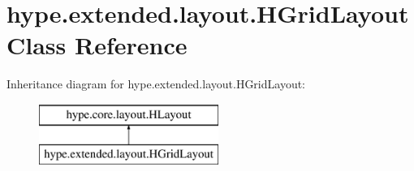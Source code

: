 \hypertarget{classhype_1_1extended_1_1layout_1_1_h_grid_layout}{\section{hype.\-extended.\-layout.\-H\-Grid\-Layout Class Reference}
\label{classhype_1_1extended_1_1layout_1_1_h_grid_layout}
}
Inheritance diagram for hype.\-extended.\-layout.\-H\-Grid\-Layout\-:\begin{figure}[H]
\begin{center}
\leavevmode
\includegraphics[height=2.000000cm]{classhype_1_1extended_1_1layout_1_1_h_grid_layout}
\end{center}
\end{figure}
